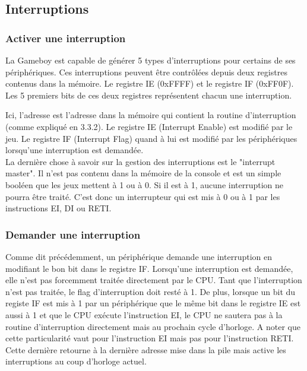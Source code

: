 \documentclass[a4paper]{article}
\begin{document}
\subsection{Interruptions}

\subsubsection{Activer une interruption}
La Gameboy est capable de générer 5 types d'interruptions pour certains de ses
périphériques. Ces interruptions peuvent être contrôlées depuis deux registres
contenus dans la mémoire. Le registre IE (0xFFFF) et le registre IF (0xFF0F).
Les 5 premiers bits de ces deux registres représentent chacun une interruption.
\begin{center}
\end{center}
Ici, l'adresse est l'adresse dans la mémoire qui contient la routine d'interruption
(comme expliqué en 3.3.2). Le registre IE (Interrupt Enable) est modifié par le jeu.
Le registre IF (Interrupt Flag) quand à lui est modifié par les périphériques lorsqu'une 
interruption est demandée. \\

La dernière chose à savoir sur la gestion des interruptions est le "interrupt master".
Il n'est pas contenu dans la mémoire de la console et est un simple booléen que les
jeux mettent à 1 ou à 0. Si il est à 1, aucune interruption ne pourra être traité.
C'est donc un interrupteur qui est mis à 0 ou à 1 par les instructions EI, DI ou RETI.

\subsubsection{Demander une interruption}
Comme dit précédemment, un périphérique demande une interruption en modifiant le
bon bit dans le registre IF. Lorsqu'une interruption est demandée, elle n'est pas
forcemment traitée directement par le CPU. Tant que l'interruption n'est pas traitée,
le flag d'interruption doit resté à 1. De plus, lorsque un bit du registe IF est mis
à 1 par un périphérique que le même bit dans le registre IE est aussi à 1 et que
le CPU exécute l'instruction EI, le CPU ne sautera pas à la routine d'interruption
directement mais au prochain cycle d'horloge. A noter que cette particularité vaut 
pour l'instruction EI mais pas pour l'instruction RETI. Cette dernière retourne à
la dernière adresse mise dans la pile mais active les interruptions au coup d'horloge
actuel. \\
\end{document}
